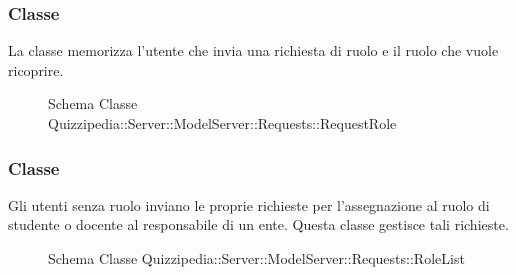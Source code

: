 \subsubsection{Classe }
La classe memorizza l'utente che invia una richiesta di ruolo e il ruolo che vuole ricoprire.
\begin{figure}[H]
\centering
\noindent{}
\caption[Schema Classe RequestRole]{Schema Classe Quizzipedia::Server::ModelServer::Requests::RequestRole}
\end{figure}
\subsubsection{Classe }
Gli utenti senza ruolo inviano le proprie richieste per l'assegnazione al ruolo di studente o docente al responsabile di un ente. Questa classe gestisce tali richieste.
\begin{figure}[H]
\centering
\noindent{}
\caption[Schema Classe RoleList]{Schema Classe Quizzipedia::Server::ModelServer::Requests::RoleList}
\end{figure}
